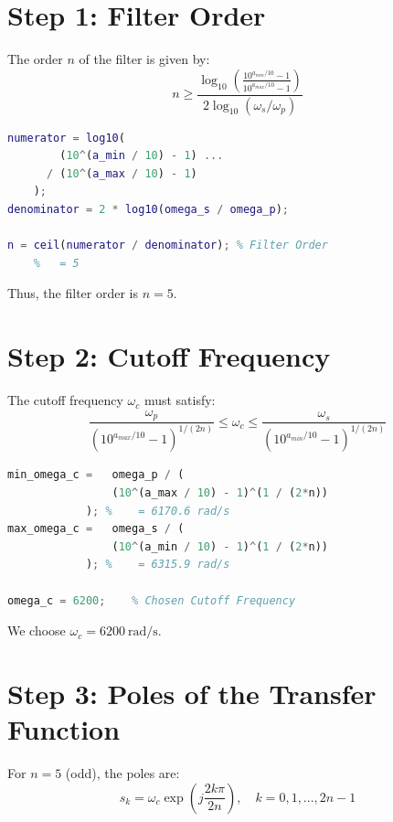 \documentclass[12pt]{article}
\begin{document}
\section*{Step 1: Filter Order}
The order $n$ of the filter is given by:
\begin{equation*}
n \geq \frac{ \log_{10} \left( \frac{10^{a_{min}/10} - 1}{10^{a_{max}/10} - 1} \right) }{ 2 \log_{10} (\omega_s/\omega_p) }
\end{equation*}

\begin{lstlisting}[language=Matlab, caption={Order Calculation}]
numerator = log10(
        (10^(a_min / 10) - 1) ...
      / (10^(a_max / 10) - 1)
    );
denominator = 2 * log10(omega_s / omega_p);

n = ceil(numerator / denominator); % Filter Order
    %   = 5
\end{lstlisting}
Thus, the filter order is $n = 5$.

\section*{Step 2: Cutoff Frequency}
The cutoff frequency $\omega_c$ must satisfy:
\begin{equation*}
\frac{\omega_p}{(10^{a_{max}/10} - 1)^{1/(2n)}} \leq \omega_c \leq \frac{\omega_s}{(10^{a_{min}/10} - 1)^{1/(2n)}}
\end{equation*}
\begin{lstlisting}[language=Octave, caption={Cutoff Frequency Calculation}]
min_omega_c =   omega_p / (
                (10^(a_max / 10) - 1)^(1 / (2*n))
            ); %    = 6170.6 rad/s
max_omega_c =   omega_s / (
                (10^(a_min / 10) - 1)^(1 / (2*n))
            ); %    = 6315.9 rad/s

omega_c = 6200;    % Chosen Cutoff Frequency
\end{lstlisting}
We choose $\omega_c = 6200\ \text{rad/s}$.


\section*{Step 3: Poles of the Transfer Function}
For $n=5$ (odd), the poles are:
\begin{equation*}
s_k = \omega_c \exp\left( j \frac{2k\pi}{2n} \right), \quad k = 0, 1, ..., 2n-1
\end{equation*}
\end{document}
